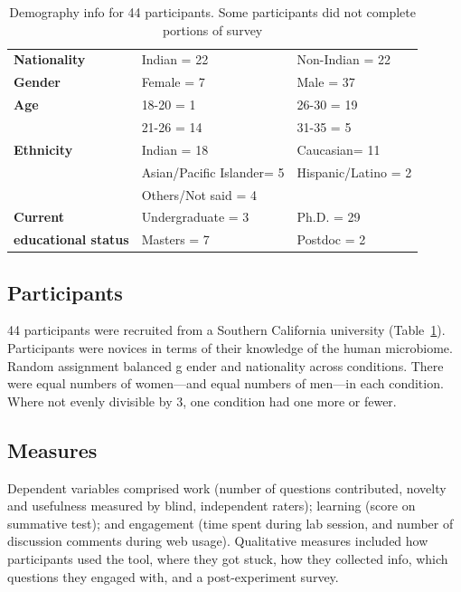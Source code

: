 \vspace{0.25in}
\begin{table}[!ht]
\caption[Demography info for 44 participants. Some participants did not complete portions of survey]{Demography info for 44 participants. Some participants did not complete portions of survey}

\vspace{-0.25in}
\begin{center}
\renewcommand{\arraystretch}{1.5} %
\begin{tabular}{|>{\bf}p{1.5in}|p{1.5in}|p{1.5in}|}
\hline
Nationality	&	Indian = 22	&	Non-Indian = 22\\
Gender		&	Female = 7	&	Male = 37\\
Age			&	18-20 = 1		& 	26-30 = 19\\
			&	21-26 = 14	&	31-35 = 5\\
Ethnicity		&	Indian = 18	& 	Caucasian= 11\\
			&	Asian/Pacific Islander= 5	&	Hispanic/Latino = 2\\
			&	Others/Not said = 4	 &				\\
Current		& 	Undergraduate = 3	& Ph.D. = 29\\
 educational status 	&	Masters = 7	&	Postdoc = 2\\
\hline
\end{tabular}
\end{center}
\label{tab:gi-demo}
\end{table}

\subsection*{Participants}
44 participants were recruited from a Southern California university (Table~\ref{tab:gi-demo}). Participants were novices in terms of their knowledge of the human microbiome. Random assignment balanced g ender and nationality across conditions. There were equal numbers of women---and equal numbers of men---in each condition. Where not evenly divisible by 3, one condition had one more or fewer. 

\subsection*{Measures}
Dependent variables comprised work (number of questions contributed, novelty and usefulness measured by blind, independent raters); learning (score on summative test); and engagement (time spent during lab session, and number of discussion comments during web usage). Qualitative measures included how participants used the tool, where they got stuck, how they collected info, which questions they engaged with, and a post-experiment survey.


